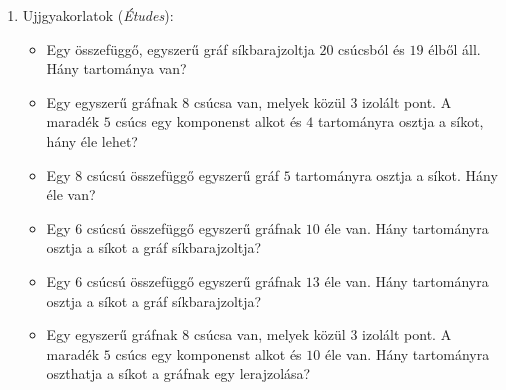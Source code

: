 \documentclass[a4paper, 12pt]{article}
\begin{document}
\begin{enumerate}
            \item Ujjgyakorlatok (\textit{Études}):
            \begin{itemize}
                \item Egy összefüggő, egyszerű gráf síkbarajzoltja $20$ csúcsból és $19$ élből áll. Hány tartománya van?
                \item Egy egyszerű gráfnak $8$ csúcsa van, melyek közül $3$ izolált pont. A maradék $5$ csúcs egy komponenst alkot és $4$ tartományra osztja a síkot, hány éle lehet?
                \item Egy $8$ csúcsú összefüggő egyszerű gráf $5$ tartományra osztja a síkot. Hány éle van?
                \item Egy $6$ csúcsú összefüggő egyszerű gráfnak $10$ éle van. Hány tartományra osztja a síkot a gráf síkbarajzoltja?
                \item Egy $6$ csúcsú összefüggő egyszerű gráfnak $13$ éle van. Hány tartományra osztja a síkot a gráf síkbarajzoltja?
                \item Egy egyszerű gráfnak $8$ csúcsa van, melyek közül $3$ izolált pont. A maradék $5$ csúcs egy komponenst alkot és $10$ éle van. Hány tartományra oszthatja a síkot a gráfnak egy lerajzolása?
            \end{itemize}
        

\end{enumerate}
\end{document}

